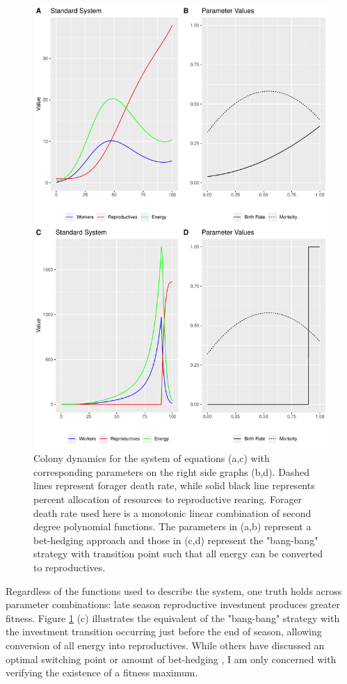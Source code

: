 \documentclass[12pt]{report}
\begin{document}
\begin{figure}[t]
\centering
\includegraphics{FinalProject-005}
\caption{Colony dynamics for the system of equations (a,c) with corresponding parameters on the right side graphs (b,d). Dashed lines represent forager death rate, while solid black line represents percent allocation of resources to reproductive rearing. Forager death rate used here is a monotonic linear combination of second degree polynomial functions. The parameters in (a,b) represent a bet-hedging approach and those in (c,d) represent the "bang-bang" strategy with transition point such that all energy can be converted to reproductives.}
\label{fig: Continuous dynamics}
\end{figure}
 
Regardless of the functions used to describe the system, one truth holds across parameter combinations: late season reproductive investment produces greater fitness. Figure \ref{fig: Continuous dynamics} (c)  illustrates the equivalent of the "bang-bang" strategy with the investment transition occurring just before the end of season, allowing conversion of all energy into reproductives. While others have discussed an optimal switching point or amount of bet-hedging \cite{poitrineau2009workers}, I am only concerned with verifying the existence of a fitness maximum. 
\end{document}
